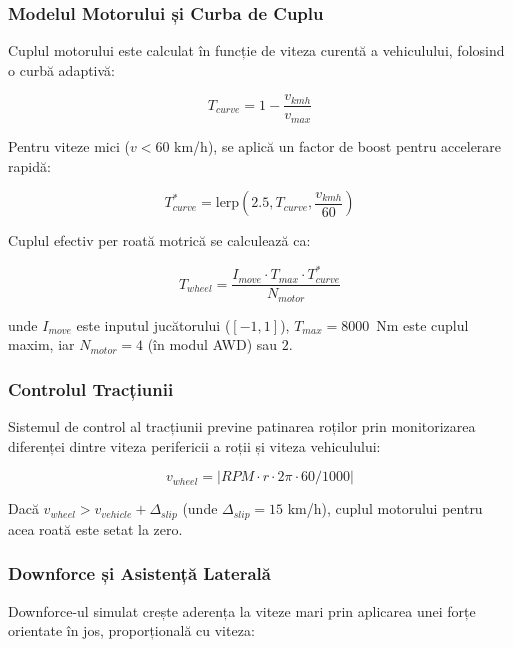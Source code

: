 \subsubsection{Modelul Motorului și Curba de Cuplu}

Cuplul motorului este calculat în funcție de viteza curentă a vehiculului, folosind o curbă adaptivă:

\begin{equation}
    T_{curve} = 1 - \frac{v_{kmh}}{v_{max}}
\end{equation}

Pentru viteze mici ($v < 60$ km/h), se aplică un factor de boost pentru accelerare rapidă:

\begin{equation}
    T_{curve}^{*} = \text{lerp}\left(2.5, T_{curve}, \frac{v_{kmh}}{60}\right)
\end{equation}

Cuplul efectiv per roată motrică se calculează ca:

\begin{equation}
    T_{wheel} = \frac{I_{move} \cdot T_{max} \cdot T_{curve}^{*}}{N_{motor}}
\end{equation}

unde $I_{move}$ este inputul jucătorului ($[-1, 1]$), $T_{max} = 8000$~Nm este cuplul maxim, iar $N_{motor} = 4$ (în modul AWD) sau $2$.

\subsubsection{Controlul Tracțiunii}

Sistemul de control al tracțiunii previne patinarea roților prin monitorizarea diferenței dintre viteza perifericii a roții și viteza vehiculului:

\begin{equation}
    v_{wheel} = |RPM \cdot r \cdot 2\pi \cdot 60 / 1000|
\end{equation}

Dacă $v_{wheel} > v_{vehicle} + \Delta_{slip}$ (unde $\Delta_{slip} = 15$ km/h), cuplul motorului pentru acea roată este setat la zero.

\subsubsection{Downforce și Asistență Laterală}

Downforce-ul simulat crește aderența la viteze mari prin aplicarea unei forțe orientate în jos, proporțională cu viteza:

